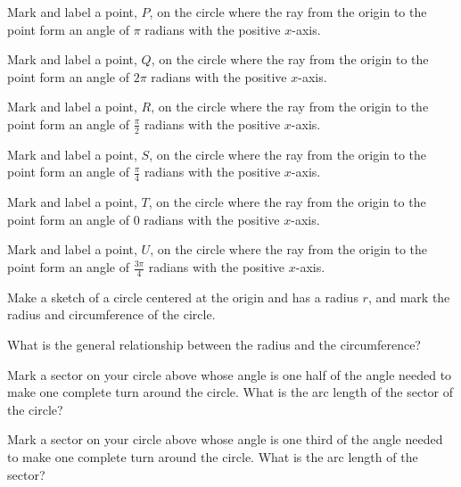 \begin{problem}
  \begin{subproblem}
  \item Mark and label a point, $P$, on the circle where the ray from the origin to
    the point form an angle of $\pi$ radians with the positive $x$-axis.
  \item Mark and label a point, $Q$, on the circle where the ray from the origin to
    the point form an angle of $2\pi$ radians with the positive $x$-axis.
  \item Mark and label a point, $R$, on the circle where the ray from the origin to
    the point form an angle of $\frac{\pi}{2}$ radians with the positive $x$-axis.
  \item Mark and label a point, $S$, on the circle where the ray from the origin to
    the point form an angle of $\frac{\pi}{4}$ radians with the positive $x$-axis.
  \item Mark and label a point, $T$, on the circle where the ray from the origin to
    the point form an angle of $0$ radians with the positive $x$-axis.
  \item Mark and label a point, $U$, on the circle where the ray from the origin to
    the point form an angle of $\frac{3\pi}{4}$ radians with the positive $x$-axis.
  \end{subproblem}

  \clearpage

\item Make a sketch of a circle centered at the origin and has a
  radius $r$, and mark the radius and circumference of the circle.
  \vfill

  \begin{subproblem}
  \item What is the general relationship between the radius and the
    circumference?
    \vspace{4em}

  \item Mark a sector on your circle above whose angle is one half of
    the angle needed to make one complete turn around the circle. What
    is the arc length of the sector of the circle?  


    \vspace{4em}

  \item Mark a sector on your circle above whose angle is one third of
    the angle needed to make one complete turn around the circle. What
    is the arc length of the sector?  



\end{subproblem}
\end{problem}
